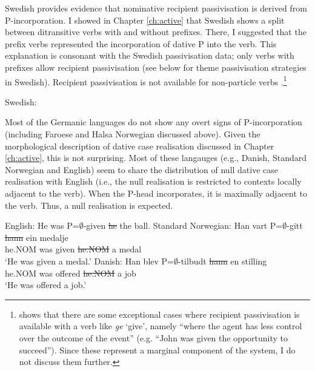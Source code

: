 Swedish provides evidence that nominative recipient passivisation is derived from P-incorporation. I showed in Chapter \ref{ch:active} that Swedish shows a split between ditransitive verbs with and without prefixes. There, I suggested that the prefix verbs represented the incorporation of dative P into the verb. This explanation is consonant with the Swedish passivisation data; only verbs with prefixes allow recipient passivisation (see below for theme passivisation strategies in Swedish). Recipient passivisation is not available for non-particle verbs \citep{Lundquist.2006}.\footnote{\cite{Lundquist.2004} shows that there are some exceptional cases where recipient passivisation is available with a verb like \textit{ge} `give', namely ``where the agent has less control over the outcome of the event'' (e.g. ``John was given the opportunity to succeed''). Since these represent a marginal component of the system, I do not discuss them further.}

\begin{exe}
	\ex Swedish:\label{ex:swe-part}
	\begin{xlist}
\end{xlist}	
\end{exe}


Most of the Germanic languages do not show any overt signs of P-incorporation (including Faroese and Halsa Norwegian discussed above). Given the morphological description of dative case realisation discussed in Chapter \ref{ch:active}, this is not surprising. Most of these langauges (e.g., Danish, Standard Norwegian and English) seem to share the distribution of null dative case realisation with English (i.e., the null realisation is restricted to contexts locally adjacent to the verb). When the P-head incorporates, it is maximally adjacent to the verb. Thus, a null realisation is expected.

\begin{exe}
	\ex English: He was P=$\emptyset$-given \sout{he} the ball.\label{ex:eng-null-incorp}
	\ex Standard Norwegian:\label{ex:nor-null-incorp}
	\gll Han vart P=$\emptyset$-gitt \sout{hann} ein medalje\\
	he.NOM was given \sout{he.NOM} a medal\\
	\trans `He was given a medal.'
	\ex Danish:\label{ex:dan-null-incorp}
	\gll Han blev P=$\emptyset$-tilbudt \sout{hann} en stilling\\
	he.NOM was offered \sout{he.NOM} a job\\
	\trans `He was offered a job.'
\end{exe}

